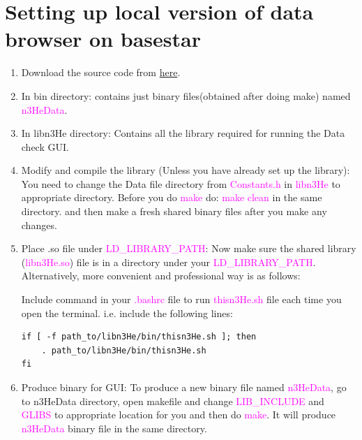 \documentclass[12pt]{article}
\begin{document}
\section{Setting up local version of data browser on basestar}
\begin{enumerate}
\item Download the source code from \href{http://latifkabir.github.io/n3He_Soft/}{here}. \\

\item In bin directory: contains just binary files(obtained after doing make) named \textcolor{magenta}{n3HeData}.

\item In libn3He directory: Contains all the library required for running the Data check GUI.

\item Modify and compile the library (Unless you have already set up the library):
   You need to change the Data file directory from \textcolor{magenta}{Constants.h} in \textcolor{magenta}{libn3He} to appropriate directory. Before you do \textcolor{magenta}{make} do: \textcolor{magenta}{make clean}   
   in the same directory.  and then make a fresh shared binary files after you make any changes.

\item Place .so file under \textcolor{magenta}{LD\_LIBRARY\_PATH}:
   Now make sure the shared library (\textcolor{magenta}{libn3He.so}) file is in a directory under your \textcolor{magenta}{LD\_LIBRARY\_PATH}. \\ 

  Alternatively, more convenient and  professional way is as follows:
   
 Include command in your \textcolor{magenta}{.bashrc} file to run \textcolor{magenta}{thisn3He.sh} file each time you open the terminal. i.e. include the following lines:

\begin{lstlisting}
if [ -f path_to/libn3He/bin/thisn3He.sh ]; then
	. path_to/libn3He/bin/thisn3He.sh
fi
\end{lstlisting}

\item Produce binary for GUI:
To produce a new binary file named \textcolor{magenta}{n3HeData}, go to n3HeData directory, open makefile and change \textcolor{magenta}{LIB\_INCLUDE} and \textcolor{magenta}{GLIBS} to
  appropriate location for you and then do \textcolor{magenta}{make}. It will produce \textcolor{magenta}{n3HeData} binary file in the same directory. 


\end{enumerate}
\end{document}
